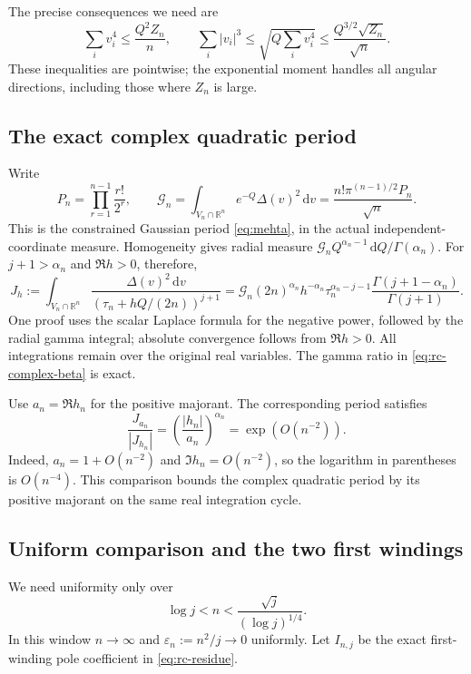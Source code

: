 \documentclass[11pt]{article}
\numberwithin{equation}{section}
\theoremstyle{definition}
\newcommand{\R}{\mathbb R}
\newcommand{\dd}{\,\mathrm d}
\begin{document}
The precise consequences we need are
\begin{equation}\label{eq:rc-angular-power-bounds}
 \sum_i v_i^4\le\frac{Q^2Z_n}{n},\qquad
 \sum_i|v_i|^3
 \le\sqrt{Q\sum_i v_i^4}
 \le\frac{Q^{3/2}\sqrt{Z_n}}{\sqrt n}.
\end{equation}
These inequalities are pointwise; the exponential moment handles
all angular directions, including those where $Z_n$ is large.

\subsection{The exact complex quadratic period}

Write
\[
 P_n=\prod_{r=1}^{n-1}\frac{r!}{2^r},\qquad
 \mathcal G_n=\int_{V_n\cap\R^n}e^{-Q}\Delta(v)^2\dd v
 =\frac{n!\pi^{(n-1)/2}P_n}{\sqrt n}.
\]
This is the constrained Gaussian period \eqref{eq:mehta}, in the
actual independent-coordinate measure.  Homogeneity gives radial
measure $\mathcal G_nQ^{\alpha_n-1}\dd Q/\Gamma(\alpha_n)$.
For $j+1>\alpha_n$ and $\Re h>0$, therefore,
\begin{equation}\label{eq:rc-complex-beta}
 J_h:=\int_{V_n\cap\R^n}
   \frac{\Delta(v)^2\dd v}{(\tau_n+hQ/(2n))^{j+1}}
 =\mathcal G_n(2n)^{\alpha_n}h^{-\alpha_n}
   \tau_n^{\alpha_n-j-1}
   \frac{\Gamma(j+1-\alpha_n)}{\Gamma(j+1)}.
\end{equation}
One proof uses the scalar Laplace formula for the negative power,
followed by the radial gamma integral; absolute convergence follows
from $\Re h>0$.  All integrations remain over the original real
variables.  The gamma ratio in \eqref{eq:rc-complex-beta} is exact.

Use $a_n=\Re h_n$ for the positive majorant.  The corresponding
period satisfies
\begin{equation}\label{eq:rc-phase-cost}
 \frac{J_{a_n}}{|J_{h_n}|}
 =\left(\frac{|h_n|}{a_n}\right)^{\alpha_n}
 =\exp(O(n^{-2})).
\end{equation}
Indeed, $a_n=1+O(n^{-2})$ and $\Im h_n=O(n^{-2})$, so the
logarithm in parentheses is $O(n^{-4})$. This comparison bounds
the complex quadratic period by its positive majorant on the same
real integration cycle.

\subsection{Uniform comparison and the two first windings}

We need uniformity only over
\begin{equation}\label{eq:rc-needed-window}
 \log j<n<\frac{\sqrt j}{(\log j)^{1/4}}.
\end{equation}
In this window $n\to\infty$ and $\varepsilon_n:=n^2/j\to0$
uniformly.  Let $I_{n,j}$ be the exact first-winding pole coefficient
in \eqref{eq:rc-residue}.
\end{document}
